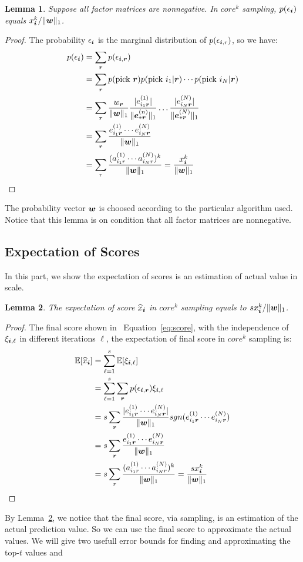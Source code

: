 \documentclass[letterpaper]{article}
\newcommand{\Sca}[3]{{#1}^{(#2)}_{i_#2#3}}%
\newcommand{\anr}[2]{\Sca{a}{#1}{#2}}
\newcommand{\enr}[2]{\Sca{e}{#1}{\V{#2}}}
\newcommand{\score}[1]{\xi_{\V{i},#1}}
\newcommand{\V}[1]{{\bm{{\MakeLowercase{#1}}}}}
\newcommand{\VnC}[3]{\V{#1}^{(#2)}_{#3}}
\newcommand{\norm}[2]{\|#1\|_{#2}}
\newcommand{\Eqn}[1]   {Equation~\ref{eq:#1}}
\newcommand{\Lem}[1]  {Lemma~\ref{lem:#1}}
\newcommand{\predx}{\widehat{x}_{\V{i}}}
\newtheorem{lemma}{Lemma}
\begin{document}
\begin{lemma}\label{lem:Probability}
    Suppose all factor matrices are nonnegative.
    In $core^k$ sampling, $p(\epsilon_{\V{i}})$ equals $x^k_{\V{i}}/\norm{\V{w}}{1}$.
\end{lemma}
\begin{proof}
The probability $\epsilon_{\V{i}}$ is the marginal distribution of $p(\epsilon_{\V{i},r})$,
so we have:
\begin{align*}
p(\epsilon_{\V{i}})
& = \sum_{\V{r}} p(\epsilon_{\V{i},\V{r}}) \\
& = \sum_{\V{r}} p({\rm pick\ }\V{r})p({\rm pick\ }i_1|\V{r})\cdots p({\rm pick\ }i_N|\V{r})\\
& = \sum_{\V{r}} \frac{w_{\V{r}}}{\norm{\V{W}}{1}}
    \frac{|\Sca{e}{1}{\V{r}}|}{\norm{\VnC{e}{n}{*\V{r}}}{1}}\ldots\frac{|\Sca{e}{N}{\V{r}}|}{\norm{\VnC{e}{N}{*\V{r}}}{1}}\\
& = \sum_{\V{r}} \frac{\Sca{e}{1}{\V{r}}\cdots\Sca{e}{N}{\V{r}}}{\norm{\V{W}}{1}}\\
& = \sum_{r}\frac{(\anr{1}{r}\cdots\anr{N}{r})^k}{\norm{\V{W}}{1}}
  = \frac{x^k_{\V{i}}}{\norm{\V{w}}{1}}
\end{align*}
\end{proof}
The probability vector $\V{w}$ is choosed according to the particular algorithm used.
Notice that this lemma is on condition that all factor matrices are nonnegative.
\subsection{Expectation of Scores}
In this part, we show the expectation of scores is an estimation of actual value in scale.
\begin{lemma}\label{lem:Expectation}
The expectation of score $\widehat{x}_{\V{i}}$ in $core^k$ sampling equals to $sx^k_{\V{i}}/\norm{\V{w}}{1}$.
\end{lemma}
\begin{proof}
    The final score shown in ~\Eqn{score},
    with the independence of $\score{\ell}$ in different iterations $\ell$,
    the expectation of final score in  $core^k$ sampling is:
\begin{align*}
\mathbb{E}[\predx]
& = \sum_{\ell=1}^{s}\mathbb{E}[\score{\ell}]\\
& = \sum_{\ell=1}^{s}\sum_{\V{r}} p(\epsilon_{\V{i},\V{r}})\score{\ell} \\
& = s\sum_{\V{r}} \frac{|\enr{1}{r}\cdots\enr{N}{r}|}{\norm{\V{W}}{1}}
                  sgn(\enr{1}{r}\cdots\enr{N}{r})\\
& = s\sum_{\V{r}} \frac{\enr{1}{r}\cdots\enr{N}{r}}{\norm{\V{W}}{1}}\\
& = s\sum_{r}\frac{(\anr{1}{r}\cdots\anr{N}{r})^k}{\norm{\V{W}}{1}}
= \frac{sx^k_{\V{i}}}{\norm{\V{w}}{1}}
\end{align*}
\end{proof}
By \Lem{Expectation}, we notice that the final score, via sampling,
is an estimation of the actual prediction value.
So we can use the final score to approximate the actual values.
We will give two usefull error bounds for finding and approximating the top-$t$ values and
\end{document}
